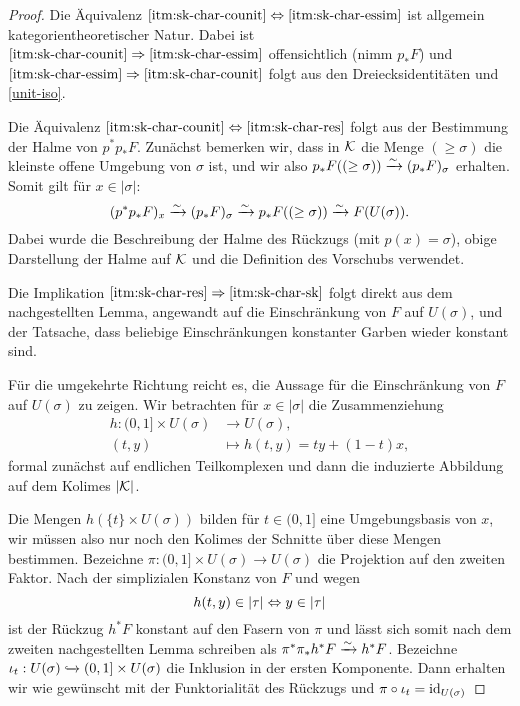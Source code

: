 \begin{proof}
  Die Äquivalenz $\ref{itm:sk-char-counit} \Leftrightarrow
  \ref{itm:sk-char-essim}$ ist allgemein kategorientheoretischer
  Natur. Dabei ist $\ref{itm:sk-char-counit} \Rightarrow
  \ref{itm:sk-char-essim}$ offensichtlich (nimm $p_* F$) und
  $\ref{itm:sk-char-essim} \Rightarrow \ref{itm:sk-char-counit}$ folgt
  aus den Dreiecksidentitäten und \ref{unit-iso}.

  Die Äquivalenz $\ref{itm:sk-char-counit} \Leftrightarrow \ref{itm:sk-char-res}$
  folgt aus der Bestimmung der Halme von $p^*p_* F$. Zunächst bemerken
  wir, dass in $\mathcal{K}$ die Menge $(\geq \sigma)$ die kleinste offene
  Umgebung von $\sigma$ ist, und wir also $p_*F((\geq \sigma)) \xrightarrow[]{\sim}
  (p_*F)_{\sigma}$ erhalten. Somit gilt für $x \in |\sigma|$:
  \begin{equation}\label{eq:counit-sect}
    (p^*p_*F)_x \xrightarrow[]{\sim} (p_*F)_{\sigma} \xrightarrow[]{\sim} p_*F((\geq \sigma)) \xrightarrow[]{\sim} F(U(\sigma)).  
  \end{equation}  
  Dabei wurde die Beschreibung der Halme des Rückzugs (mit $p(x) =
  \sigma$), obige Darstellung der Halme auf $\mathcal{K}$ und die Definition
  des Vorschubs verwendet.

  Die Implikation $\ref{itm:sk-char-res} \Rightarrow
  \ref{itm:sk-char-sk}$ folgt direkt aus dem nachgestellten Lemma,
  angewandt auf die Einschränkung von $F$ auf $U(\sigma)$, und der
  Tatsache, dass beliebige Einschränkungen konstanter Garben wieder
  konstant sind.

  Für die umgekehrte Richtung reicht es, die Aussage für die
  Einschränkung von $F$ auf $U(\sigma)$ zu zeigen.  Wir betrachten für
  $x \in |\sigma|$ die Zusammenziehung
  \begin{align*}
    h: (0, 1] \times U(\sigma) &\to U(\sigma), \\
    (t, y) &\mapsto h(t, y) = t y + (1 - t) x,
  \end{align*}
  formal zunächst auf endlichen Teilkomplexen und dann die induzierte
  Abbildung auf dem Kolimes $|\mathcal{K}|$.
  
  Die Mengen $h(\{t\} \times U(\sigma))$ bilden für $t \in (0, 1]$
  eine Umgebungsbasis von $x$, wir müssen also nur noch den Kolimes
  der Schnitte über diese Mengen bestimmen. Bezeichne $\pi: (0, 1]
  \times U(\sigma) \to U(\sigma)$ die Projektion auf den zweiten
  Faktor. Nach der simplizialen Konstanz von $F$ und wegen
  \[ h(t, y) \in |\tau| \Leftrightarrow y \in |\tau| \]
  ist der Rückzug $h^* F$ konstant auf den Fasern von $\pi$ und lässt
  sich somit nach dem zweiten nachgestellten Lemma schreiben als
  $\pi^* \pi_* h^* F \xrightarrow[]{\sim} h^* F$. Bezeichne $\iota_t: U(\sigma)
  \xhookrightarrow{} (0, 1] \times U(\sigma)$ die Inklusion in der
    ersten Komponente. Dann erhalten wir wie gewünscht mit der
    Funktorialität des Rückzugs und $\pi \circ \iota_t =
    \operatorname{id}_{U(\sigma)}$


\end{proof}
